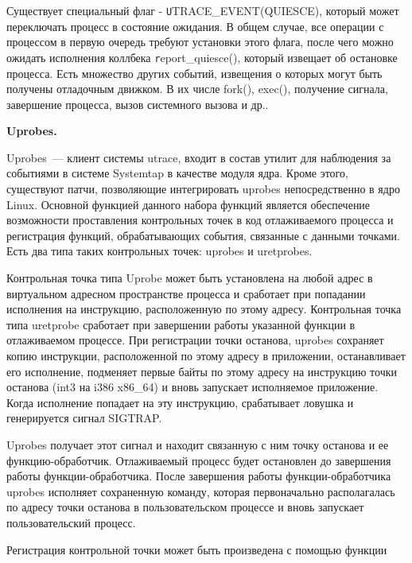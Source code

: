 

\bigskip 
Существует специальный флаг - {\texttt UTRACE\_EVENT(QUIESCE)}, 
который может переключать процесс в состояние ожидания. В общем 
случае, все операции с процессом в первую очередь требуют 
установки этого флага, после чего можно ожидать исполнения 
коллбека {\texttt report\_quiesce()}, который извещает об 
остановке процесса. Есть множество других событий, извещения 
о которых могут быть получены отладочным движком. В их числе 
fork(), exec(), получение сигнала, завершение процесса, вызов 
системного вызова и др..

\bigskip
{\bfseries Uprobes.}

\bigskip
Uprobes~--- клиент системы utrace, входит в состав утилит для 
наблюдения за событиями в системе Systemtap в качестве модуля ядра. 
Кроме этого, существуют патчи, позволяющие интегрировать uprobes 
непосредственно в ядро Linux. Основной функцией данного набора функций 
является обеспечение возможности проставления контрольных точек в код 
отлаживаемого процесса и регистрация функций, обрабатывающих события, 
связанные с данными точками. Есть два типа таких контрольных точек: 
uprobes и uretprobes. 

Контрольная точка типа Uprobe может быть установлена на любой адрес в 
виртуальном адресном пространстве процесса и сработает при попадании 
исполнения на инструкцию, расположенную по этому адресу. Контрольная
точка типа uretprobe сработает при завершении работы указанной функции
в отлаживаемом процессе. При регистрации точки останова, uprobes сохраняет
копию инструкции, расположенной по этому адресу в приложении, останавливает 
его исполнение, подменяет первые байты по этому адресу на инструкцию 
точки останова (int3 на i386 x86\_64) и вновь запускает исполняемое 
приложение. Когда исполнение попадает на эту инструкцию, срабатывает 
ловушка и генерируется сигнал SIGTRAP.

Uprobes получает этот сигнал и 
находит связанную с ним точку останова и ее функцию-обработчик. 
Отлаживаемый процесс будет остановлен до завершения работы 
функции-обработчика. После завершения работы функции-обработчика uprobes 
исполняет сохраненную команду, которая первоначально располагалась 
по адресу точки останова в пользовательском процессе и вновь запускает 
пользовательский процесс.   

Регистрация контрольной точки может быть произведена с помощью функции
 
